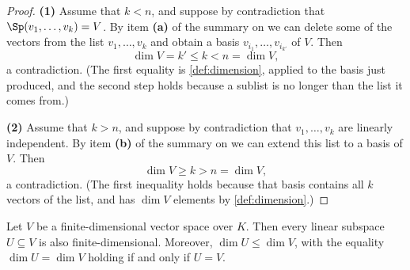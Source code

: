 \begin{proof}
\textbf{(1)} Assume that $k < n$, and suppose by contradiction that $\Sp(v_1, \dots, v_k) = V$. By item \textbf{(a)} of the summary on  we can delete some of the vectors from the list $v_1, \dots, v_k$ and obtain a basis $v_{i_1}, \dots, v_{i_{k'}}$ of $V$. Then
\[
\dim V = k' \le k < n = \dim V,
\]
a contradiction. (The first equality is \cref{def:dimension}, applied to the basis just produced, and the second step holds because a sublist is no longer than the list it comes from.)

\textbf{(2)} Assume that $k > n$, and suppose by contradiction that $v_1, \dots, v_k$ are linearly independent. By item \textbf{(b)} of the summary on  we can extend this list to a basis of $V$. Then
\[
\dim V \ge k > n = \dim V,
\]
a contradiction. (The first inequality holds because that basis contains all $k$ vectors of the list, and has $\dim V$ elements by \cref{def:dimension}.)
\end{proof}

\begin{proposition}
\label{prop:subspace_dimension_constraints}
Let $V$ be a finite-di\-men\-sional vector space over $K$. Then every linear subspace $U \subseteq V$ is also finite-di\-men\-sional. Moreover, $\dim U \le \dim V$, with the equality $\dim U = \dim V$ holding if and only if $U = V$.
\end{proposition}

